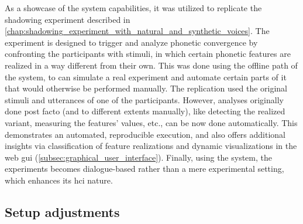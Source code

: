 As a showcase of the system capabilities, it was utilized to replicate the shadowing experiment described in \cref{chap:shadowing_experiment_with_natural_and_synthetic_voices}.
The experiment is designed to trigger and analyze phonetic convergence by confronting the participants with stimuli, in which certain phonetic features are realized in a way different from their own.
This was done using the offline path of the system, to can simulate a real experiment and automate certain parts of it that would otherwise be performed manually.
The replication used the original stimuli and utterances of one of the participants.
However, analyses originally done post facto (and to different extents manually), like detecting the realized variant, measuring the features' values, etc., can be now done automatically.
This demonstrates an automated, reproducible execution, and also offers additional insights via classification of feature realizations and dynamic visualizations in the web \ac{gui} (\cref{subsec:graphical_user_interface}).
Finally, using the system, the experiments becomes dialogue-based rather than a mere experimental setting, which enhances its \ac{hci} nature.

\subsection{Setup adjustments}
\label{subsec:setup_adjustments}

